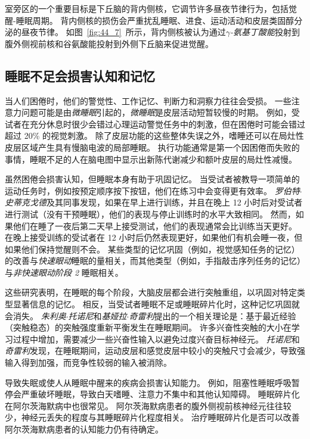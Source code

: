 室旁区的一个重要目标是下丘脑的背内侧核，它调节许多昼夜节律行为，包括觉醒-睡眠周期。
背内侧核的损伤会严重扰乱睡眠、进食、运动活动和皮层类固醇分泌的昼夜节律。
如图~\ref{fig:44_7}~所示，背内侧核被认为通过\textit{$\gamma$-氨基丁酸能}投射到腹外侧视前核和谷氨酸能投射到外侧下丘脑来促进觉醒。



\subsection{睡眠不足会损害认知和记忆}

当人们困倦时，他们的警觉性、工作记忆、判断力和洞察力往往会受损。
一些注意力问题可能是由\textit{微睡眠}引起的，\textit{微睡眠}是皮层活动短暂较慢的时期。
例如，受试者在充分休息时很少会错过心理运动警觉任务中的刺激，但在困倦时可能会错过超过 20\% 的视觉刺激。
除了皮层功能的这些整体失误之外，嗜睡还可以在局灶性皮层区域产生具有慢脑电波的局部睡眠。
执行功能通常是第一个因困倦而失败的事情，睡眠不足的人在脑电图中显示出新陈代谢减少和额叶皮层的局灶性减慢。


虽然困倦会损害认知，但睡眠本身有助于巩固记忆。
当受试者被教导一项简单的运动任务时，例如按预定顺序按下按钮，他们在练习中会变得更有效率。
\textit{罗伯特$\cdot$史蒂克戈德}及其同事发现，如果在早上进行训练，并且在晚上 12 小时后对受试者进行测试（没有干预睡眠），他们的表现与停止训练时的水平大致相同。
然而，如果他们在睡了一夜后第二天早上接受测试，他们的表现通常会比训练当天更好。
在晚上接受训练的受试者在 12 小时后仍然表现更好，如果他们有机会睡一夜，但如果他们保持觉醒则不会。
某些类型的记忆巩固（例如，视觉感知任务的记忆）的改善与\textit{快速眼动}睡眠的量相关，而其他类型（例如，手指敲击序列任务的记忆）与\textit{非快速眼动阶段 2} 睡眠相关。


这些研究表明，在睡眠的每个阶段，大脑皮层都会进行突触重组，以巩固对特定类型显著信息的记忆。
相反，当受试者睡眠不足或睡眠碎片化时，这种记忆巩固就会消失。
\textit{朱利奥$\cdot$托诺尼}和\textit{基娅拉$\cdot$奇雷利}提出的一个相关理论是：基于最近经验（突触稳态）的突触强度重新平衡发生在睡眠期间。
许多兴奋性突触的大小在学习过程中增加，需要减少一些兴奋性输入以避免过度兴奋目标神经元。
\textit{托诺尼}和\textit{奇雷利}发现，在睡眠期间，运动皮层和感觉皮层中较小的突触尺寸会减少，导致强输入得到加强，而竞争性较弱的输入被消除。


导致失眠或使人从睡眠中醒来的疾病会损害认知能力。
例如，阻塞性睡眠呼吸暂停会严重破坏睡眠，导致白天嗜睡、注意力不集中和其他认知障碍。
睡眠碎片化在阿尔茨海默病中也很常见。
阿尔茨海默病患者的腹外侧视前核神经元往往较少，神经元丢失的程度与其睡眠碎片化程度相关。
治疗睡眠碎片化是否可以改善阿尔茨海默病患者的认知能力仍有待确定。



